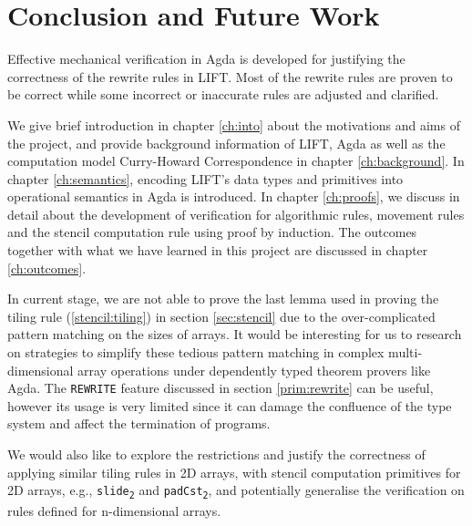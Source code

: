 \documentclass{l4proj}
\begin{document}
\chapter{Conclusion and Future Work}
\label{ch:conclusion}
Effective mechanical verification in Agda is developed for justifying the correctness of the rewrite rules in LIFT. Most of the rewrite rules are proven to be correct while some incorrect or inaccurate rules are adjusted and clarified.

We give brief introduction in chapter \ref{ch:into} about the motivations and aims of the project, and provide background information of LIFT, Agda as well as the computation model Curry-Howard Correspondence in chapter \ref{ch:background}. In chapter \ref{ch:semantics}, encoding LIFT's data types and primitives into operational semantics in Agda is introduced. In chapter \ref{ch:proofs}, we discuss in detail about the development of verification for algorithmic rules, movement rules and the stencil computation rule using proof by induction. The outcomes together with what we have learned in this project are discussed in chapter \ref{ch:outcomes}.

In current stage, we are not able to prove the last lemma used in proving the tiling rule (\ref{stencil:tiling}) in section \ref{sec:stencil} due to the over-complicated pattern matching on the sizes of arrays. It would be interesting for us to research on strategies to simplify these tedious pattern matching in complex multi-dimensional array operations under dependently typed theorem provers like Agda. The \texttt{REWRITE} feature discussed in section \ref{prim:rewrite} can be useful, however its usage is very limited since it can damage the confluence of the type system and affect the termination of programs.

We would also like to explore the restrictions and justify the correctness of applying similar tiling rules in 2D arrays, with stencil computation primitives for 2D arrays, e.g., \texttt{slide\textsubscript{2}} and \texttt{padCst\textsubscript{2}}, and potentially generalise the verification on rules defined for n-dimensional arrays.


%
% 
\end{document}

